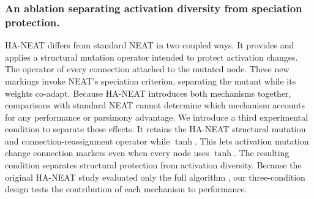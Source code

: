
\subsubsection{An ablation separating activation diversity from speciation protection.}
HA-NEAT \parencite{hagg_evolving_2017} differs from standard NEAT \parencite{stanley_evolving_2002} in two coupled ways. 
It provides  and applies a structural mutation operator intended to protect activation changes.
The operator  of every connection attached to the mutated node.
These new markings invoke NEAT's speciation criterion, separating the mutant while its weights co-adapt. 
Because HA-NEAT introduces both mechanisms together, comparisons with standard NEAT cannot determine which mechanism accounts for any performance or parsimony advantage.
We introduce a third experimental condition to separate these effects. 
It retains the HA-NEAT structural mutation and connection-reassignment operator while  $\tanh$.
This lets activation mutation change connection markers even when every node uses $\tanh$.
The resulting condition separates structural protection from activation diversity. 
Because the original HA-NEAT study evaluated only the full algorithm \parencite{hagg_evolving_2017}, our three-condition design tests the contribution of each mechanism to performance.


